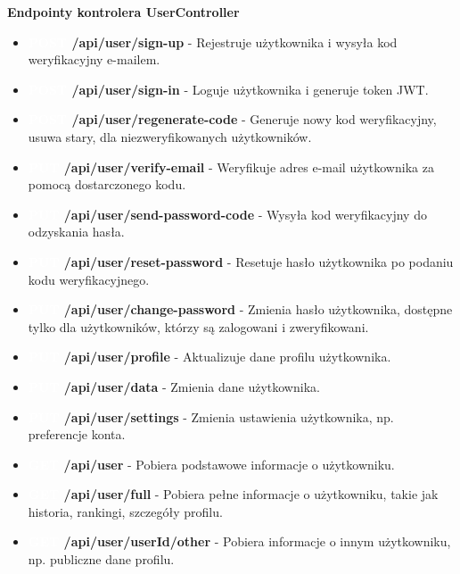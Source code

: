 \documentclass[twoside]{projektInzynierskiMS1}
\begin{document}
\newpage

\noindent \textbf{Endpointy kontrolera UserController}
\begin{itemize} 
    \setlength\itemsep{0cm}
    \item \textbf{\colorbox{green!90}{\textcolor{white}{POST}} /api/user/sign-up} - Rejestruje użytkownika i wysyła kod weryfikacyjny e-mailem. 
    \item \textbf{\colorbox{green!90}{\textcolor{white}{POST}} /api/user/sign-in} - Loguje użytkownika i generuje token JWT. 
    \item \textbf{\colorbox{green!90}{\textcolor{white}{POST}} /api/user/regenerate-code} - Generuje nowy kod weryfikacyjny, usuwa stary, dla niezweryfikowanych użytkowników. 
    \item \textbf{\colorbox{orange!90}{\textcolor{white}{PUT}} /api/user/verify-email} - Weryfikuje adres e-mail użytkownika za pomocą dostarczonego kodu. 
    \item \textbf{\colorbox{orange!90}{\textcolor{white}{PUT}} /api/user/send-password-code} - Wysyła kod weryfikacyjny do odzyskania hasła. 
    \item \textbf{\colorbox{orange!90}{\textcolor{white}{PUT}} /api/user/reset-password} - Resetuje hasło użytkownika po podaniu kodu weryfikacyjnego. 
    \item \textbf{\colorbox{orange!90}{\textcolor{white}{PUT}} /api/user/change-password} - Zmienia hasło użytkownika, dostępne tylko dla użytkowników, którzy są zalogowani i zweryfikowani. 
    \item \textbf{\colorbox{orange!90}{\textcolor{white}{PUT}} /api/user/profile} - Aktualizuje dane profilu użytkownika. 
    \item \textbf{\colorbox{orange!90}{\textcolor{white}{PUT}} /api/user/data} - Zmienia dane użytkownika. 
    \item \textbf{\colorbox{orange!90}{\textcolor{white}{PUT}} /api/user/settings} - Zmienia ustawienia użytkownika, np. preferencje konta. 
    \item \textbf{\colorbox{cyan!90}{\textcolor{white}{GET}} /api/user} - Pobiera podstawowe informacje o użytkowniku. 
    \item \textbf{\colorbox{cyan!90}{\textcolor{white}{GET}} /api/user/full} - Pobiera pełne informacje o użytkowniku, takie jak historia, rankingi, szczegóły profilu. 
    \item \textbf{\colorbox{cyan!90}{\textcolor{white}{GET}} /api/user/{userId}/other} - Pobiera informacje o innym użytkowniku, np. publiczne dane profilu. 

\end{itemize}
\end{document}
